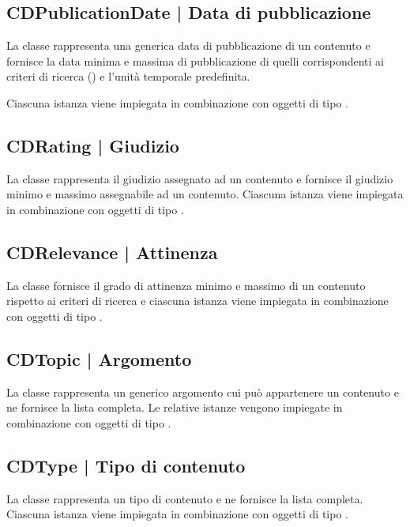 \documentclass[10pt,a4paper,headinclude,footinclude,hidelinks]{scrreprt} %
\begin{document}
	\subsection[CDPublicationDate]{CDPublicationDate | Data di pubblicazione}
	\label{sec:stage:design:sistema:model.criteria:publication-date}
	La classe rappresenta una generica data di pubblicazione di un contenuto e fornisce la data minima e massima di pubblicazione di quelli corrispondenti ai criteri di ricerca (\textit{}) e l'unità temporale predefinita.

	Ciascuna istanza viene impiegata in combinazione con oggetti di tipo \textit{}.

	\subsection[CDRating]{CDRating | Giudizio}
	\label{sec:stage:design:sistema:model.criteria:rating}
	La classe rappresenta il giudizio assegnato ad un contenuto e fornisce il giudizio minimo e massimo assegnabile ad un contenuto. Ciascuna istanza viene impiegata in combinazione con oggetti di tipo \textit{}.

	\subsection[CDRelevance]{CDRelevance | Attinenza}
	\label{sec:stage:design:sistema:model.criteria:relevance}
	La classe fornisce il grado di attinenza minimo e massimo di un contenuto rispetto ai criteri di ricerca e ciascuna istanza viene impiegata in combinazione con oggetti di tipo \textit{}.

	\subsection[CDTopic]{CDTopic | Argomento}
	\label{sec:stage:design:sistema:model.criteria:topic}
	La classe rappresenta un generico argomento cui può appartenere un contenuto e ne fornisce la lista completa. Le relative istanze vengono impiegate in combinazione con oggetti di tipo \textit{}.

	\subsection[CDType]{CDType | Tipo di contenuto}
	\label{sec:stage:design:sistema:model.criteria:type}
	La classe rappresenta un tipo di contenuto e ne fornisce la lista completa. Ciascuna istanza viene impiegata in combinazione con oggetti di tipo \textit{}.
\end{document}
